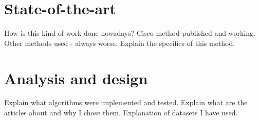 \documentclass[thesis=B,english]{FITthesis}[2012/10/20]
\begin{document}
%




\chapter{State-of-the-art}
How is this kind of work done nowadays? Cisco method published and working.
Other methods used - always worse.
Explain the specifics of this method.

\chapter{Analysis and design}
Explain what algorithms were implemented and tested.
Explain what are the articles about and why I chose them.
Explanation of datasets I have used.
\end{document}
